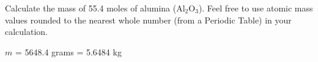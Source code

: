 
Calculate the mass of 55.4 moles of alumina (Al$_{2}$O$_{3}$).  Feel free to use atomic mass values rounded to the nearest whole number (from a Periodic Table) in your calculation.







$m$ = 5648.4 grams = 5.6484 kg











